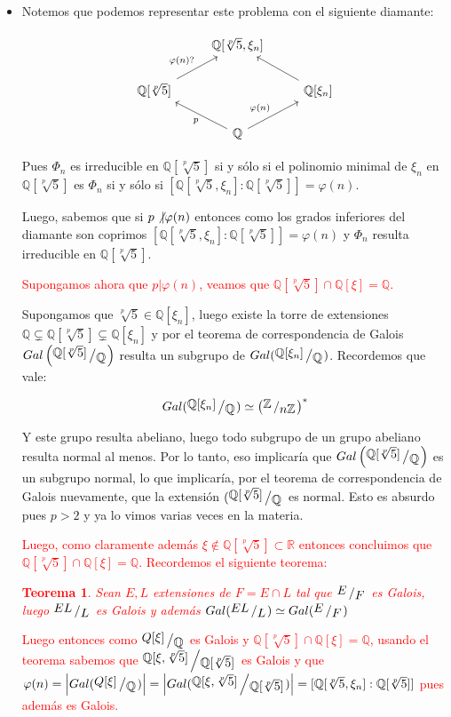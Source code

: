 \documentclass[11pt]{article}
\newcommand{\Q}{\mathbb{Q}}
\newcommand{\Z}{\mathbb{Z}}
\newcommand{\R}{{\mathbb{R}}}
\newcommand{\abs}[1]{\left\lvert#1\right\rvert}
\newcommand{\quotient}[2]{{\raisebox{.2em}{$#1$}\left/\raisebox{-.2em}{$#2$}\right.}}
\newtheorem{theorem}{Teorema}
\numberwithin{theorem}{subsection}
\begin{document}
\begin{enumerate}
\begin{itemize}
		\item Notemos que podemos representar este problema con el siguiente diamante:
		
		\[
		\begin{tikzcd}
		& \Q[\sqrt[p]{5}, \xi_n] & \\
		\Q[\sqrt[p]{5}] \arrow{ru}{\varphi(n)?}  & & \Q[\xi_n] \arrow{lu} \\ \quad
		& \Q \arrow{ru}{\varphi(n)} \arrow{lu}{p}&
		\end{tikzcd}
		\]
		
		Pues $\Phi_n$ es irreducible en $\Q[\sqrt[p]{5}]$ si y s\'olo si el polinomio minimal de $\xi_n$ en $\Q[\sqrt[p]{5}]$ es $\Phi_n$ si y s\'olo si $[\Q[\sqrt[p]{5}, \xi_n]:\Q[\sqrt[p]{5}]] = \varphi(n)$. 
		
		Luego, sabemos que si $p \not\vert \varphi(n)$ entonces como los grados inferiores del diamante son coprimos $[\Q[\sqrt[p]{5}, \xi_n]:\Q[\sqrt[p]{5}]] = \varphi(n)$ y $\Phi_n$ resulta irreducible en $\Q[\sqrt[p]{5}]$.
		
		\textcolor{red}{Supongamos ahora que $p \vert \varphi(n)$,  veamos que $\Q[\sqrt[p]{5}] \cap \Q[\xi] = \Q$.}
		
		Supongamos que $\sqrt[p]{5} \in \Q[\xi_n]$, luego existe la torre de extensiones $\Q \subsetneq \Q[\sqrt[p]{5}] \subsetneq \Q[\xi_n]$ y por el teorema de correspondencia de Galois $Gal\left(\quotient{ \Q[\sqrt[p]{5}] }{\Q}\right)$ resulta un subgrupo de $Gal(\quotient{\Q[\xi_n]}{\Q})$. Recordemos que vale:
		
		\begin{equation*}
			Gal(\quotient{\Q[\xi_n]}{\Q}) \simeq \left(\quotient{\Z}{n\Z}\right)^*
		\end{equation*}
		
		Y este grupo resulta abeliano, luego todo subgrupo de un grupo abeliano resulta normal al menos. Por lo tanto, eso implicar\'ia que $Gal\left(\quotient{ \Q[\sqrt[p]{5}] }{\Q}\right)$ es un subgrupo normal, lo que implicar\'ia, por el teorema de correspondencia de Galois nuevamente, que la extensi\'on $(\quotient{ \Q[\sqrt[p]{5}] }{\Q}$ es normal. Esto es absurdo pues $p > 2$ y ya lo vimos varias veces en la materia. 
		
		\textcolor{red}{Luego, como claramente adem\'as $\xi \not\in \Q[\sqrt[p]{5}] \subset \R$ entonces concluimos que $\Q[\sqrt[p]{5}] \cap \Q[\xi] = \Q$. Recordemos el siguiente teorema:
		\begin{theorem}
				Sean $E,L$ extensiones de $F = E \cap L$ tal que $\quotient{E}{F}$ es Galois, luego $\quotient{EL}{L}$ es Galois y adem\'as $Gal(\quotient{EL}{L}) \simeq Gal(\quotient{E}{F})$
		\end{theorem}
		Luego entonces como $\quotient{Q[\xi]}{\Q}$ es Galois y $\Q[\sqrt[p]{5}] \cap \Q[\xi] = \Q$, usando el teorema sabemos que $\quotient{\Q[\xi, \sqrt[p]{5}]}{\Q[\sqrt[p]{5}]}$ es Galois y que $\varphi(n) = \abs{Gal(\quotient{Q[\xi]}{\Q})} = \abs{Gal(\quotient{\Q[\xi, \sqrt[p]{5}]}{\Q[\sqrt[p]{5}]})} = [\Q[\sqrt[p]{5}, \xi_n]:\Q[\sqrt[p]{5}]]$ pues adem\'as es Galois.
	}
		

\end{itemize}
\end{enumerate}
\end{document}
